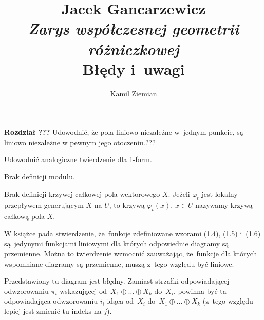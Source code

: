 \documentclass[a4paper,11pt]{article}
\title{ %
  Jacek Gancarzewicz \\
  \textit{Zarys współczesnej geometrii różniczkowej} \\
  {\Large Błędy i~uwagi}}
\author{Kamil Ziemian}
\begin{document}





\maketitle %







\noindent
\textbf{Rozdział ???} \Dok Udowodnić, że pola liniowo niezależne w~jednym
punkcie, są liniowo niezależne w pewnym jego otoczeniu.???

\vspace{\spaceFour}





\noindent
Udowodnić analogiczne twierdzenie dla 1-form.

\vspace{\spaceFour}




\noindent
Brak definicji modułu.

\vspace{\spaceFour}





\noindent
Brak definicji krzywej całkowej pola wektorowego $X$. Jeżeli $\varphi_{ t }$ jest
lokalny przepływem generującym $X$ na $U$, to krzywą $\varphi_{ t }( x )$,
$x \in U$ nazywamy krzywą całkową pola $X$.

\vspace{\spaceFour}





\noindent
{} W książce pada stwierdzenie, że~funkcje zdefiniowane wzorami
(1.4), (1.5) i~(1.6) są~jedynymi funkcjami liniowymi dla których
odpowiednie diagramy są przemienne. Można to twierdzenie wzmocnić
zauważając, że~funkcje dla których wspomniane diagramy są przemienne,
muszą z~tego względu być liniowe.

\vspace{\spaceFour}





\noindent
{} Przedstawiony tu diagram jest błędny. Zamiast strzałki
odpowiadającej odwzorowaniu $\pi_{ i }$ wskazującej
od~$X_{ 1 } \oplus \ldots \oplus X_{ k }$ do~$X_{ i }$, powinna być ta odpowiadająca
odwzorowaniu $i_{ i }$ idąca od~$X_{ i }$ do~$X_{ 1 } \oplus \ldots \oplus X_{ k }$ (z~tego
względu lepiej jest zmienić tu indeks na $j$).
\end{document}

